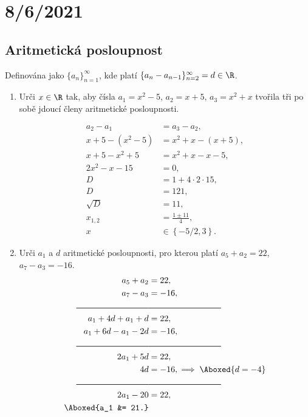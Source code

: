 \documentclass[11pt,a4paper]{article}
\begin{document}
    \section*{8/6/2021}
        \subsection*{Aritmetická posloupnost}
            
            \noindent%
            Definována jako $\{a_n\}_{n=1}^\infty$, kde platí $\{a_n - a_{n-1}\}_{n=2}^{\infty} = d \in \R$.

            \begin{enumerate}

                \item Urči $x \in \R$ tak, aby čísla $a_1 = x^2 - 5$, $a_2 = x+5$, $a_3 = x^2 + x$ tvořila tři po sobě jdoucí členy aritmetické posloupnosti.
                
                \begin{align*}
                    a_2 - a_1 &= a_3 - a_2,
                \\
                    x + 5 - (x^2 - 5) &= x^2 + x - (x+5),
                \\
                    x+5-x^2+5 &= x^2+x-x-5,
                \\
                    2x^2 - x - 15 &= 0,
                \\
                    D &= 1 + 4\cdot 2 \cdot 15,
                \\
                    D &= 121,
                \\
                    \sqrt D &= 11,
                \\
                    x_{1,2} &= \frac{1 \pm 11}{4},
                \\
                    x &\in \left\{ -5/2, 3 \right\}.
                \end{align*}

                \item Urči $a_1$ a $d$ aritmetické posloupnosti, pro kterou platí $a_5 + a_2 = 22$, $a_7 - a_3 = -16$.
                \begin{align*}
                    a_5 + a_2 &= 22,
                \\
                    a_7 - a_3 &= -16,
                \\\rule{3cm}{0.6pt}&\rule{3cm}{0.6pt}\\
                    a_1 + 4d + a_1 + d &= 22,
                \\
                    a_1 + 6d - a_1 - 2d &= -16,
                \\\rule{3cm}{0.6pt}&\rule{3cm}{0.6pt}\\
                    2a_1 + 5d &= 22,
                \\
                    4d &= -16, \implies \Aboxed{d = -4}
                \\\rule{3cm}{0.6pt}&\rule{3cm}{0.6pt}\\
                    2a_1 - 20 &= 22,
                \\
                    \Aboxed{a_1 &= 21.}
                \end{align*}


\end{enumerate}
\end{document}
